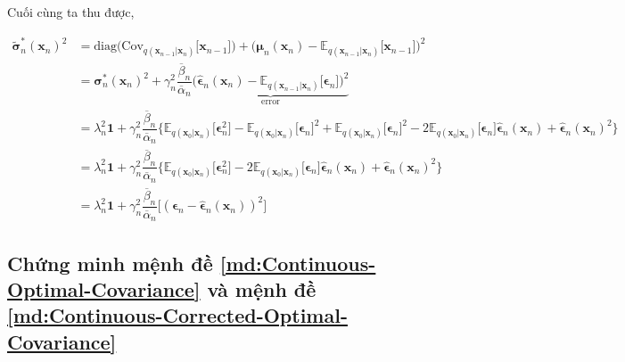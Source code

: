 \documentclass[14pt, a4paper]{article}
\numberwithin{equation}{section}
\numberwithin{figure}{section}
\numberwithin{dl}{section}
\numberwithin{md}{section}
\numberwithin{bd}{section}
\numberwithin{dn}{section}
\numberwithin{hq}{section}
\begin{document}
    Cuối cùng ta thu được,

    \begin{equation}
        \begin{aligned}
            \tilde{\boldsymbol{\sigma}}_n^{\ast} (\boldsymbol{x}_n)^2 &= \mathrm{diag} \big( \mathrm{Cov}_{q(\boldsymbol{x}_{n-1} \vert \boldsymbol{x}_n)} \lbrack \boldsymbol{x}_{n-1} \rbrack \big) + \big( \boldsymbol{\mu}_n (\boldsymbol{x}_n) - \mathbb{E}_{q(\boldsymbol{x}_{n-1} \vert \boldsymbol{x}_n)} \lbrack \boldsymbol{x}_{n-1} \rbrack \big)^2 \\
            &= \boldsymbol{\sigma}_n^{\ast}(\boldsymbol{x}_n)^2 + \gamma_n^2 \dfrac{\overline{\beta}_n}{\overline{\alpha}_n} \underbrace{\big( \hat{\boldsymbol{\epsilon}}_n (\boldsymbol{x}_n) - \mathbb{E}_{q(\boldsymbol{x}_{n-1} \vert \boldsymbol{x}_n)} \lbrack \boldsymbol{\epsilon}_n \rbrack \big)^2}_{\mathrm{error}} \\
            &= \lambda_n^2 \boldsymbol{1} + \gamma_n^2 \dfrac{\overline{\beta}_n}{\overline{\alpha}_n} \big \lbrace \mathbb{E}_{q(\boldsymbol{x}_0 \vert \boldsymbol{x}_n)} \lbrack \boldsymbol{\epsilon}_n^2 \rbrack - \mathbb{E}_{q(\boldsymbol{x}_0 \vert \boldsymbol{x}_n)} \lbrack \boldsymbol{\epsilon}_n \rbrack^2 + \mathbb{E}_{q(\boldsymbol{x}_0 \vert \boldsymbol{x}_n)} \lbrack \boldsymbol{\epsilon}_n \rbrack^2 - 2 \mathbb{E}_{q(\boldsymbol{x}_0 \vert \boldsymbol{x}_n)} \lbrack \boldsymbol{\epsilon}_n \rbrack \hat{\boldsymbol{\epsilon}}_n (\boldsymbol{x}_n) + \hat{\boldsymbol{\epsilon}}_n (\boldsymbol{x}_n)^2 \big \rbrace \\
            &= \lambda_n^2 \boldsymbol{1} + \gamma_n^2 \dfrac{\overline{\beta}_n}{\overline{\alpha}_n} \big \lbrace \mathbb{E}_{q(\boldsymbol{x}_0 \vert \boldsymbol{x}_n)} \lbrack \boldsymbol{\epsilon}_n^2 \rbrack - 2 \mathbb{E}_{q(\boldsymbol{x}_0 \vert \boldsymbol{x}_n)} \lbrack \boldsymbol{\epsilon}_n \rbrack \hat{\boldsymbol{\epsilon}}_n (\boldsymbol{x}_n) + \hat{\boldsymbol{\epsilon}}_n (\boldsymbol{x}_n)^2 \big \rbrace \\
            &= \lambda_n^2 \boldsymbol{1} + \gamma_n^2 \dfrac{\overline{\beta}_n}{\overline{\alpha}_n} \lbrack (\boldsymbol{\epsilon}_n - \hat{\boldsymbol{\epsilon}}_n (\boldsymbol{x}_n))^2 \rbrack
        \end{aligned}
    \end{equation}

    \subsection{Chứng minh mệnh đề \ref{md:Continuous-Optimal-Covariance} và mệnh đề \ref{md:Continuous-Corrected-Optimal-Covariance}}
\end{document}
